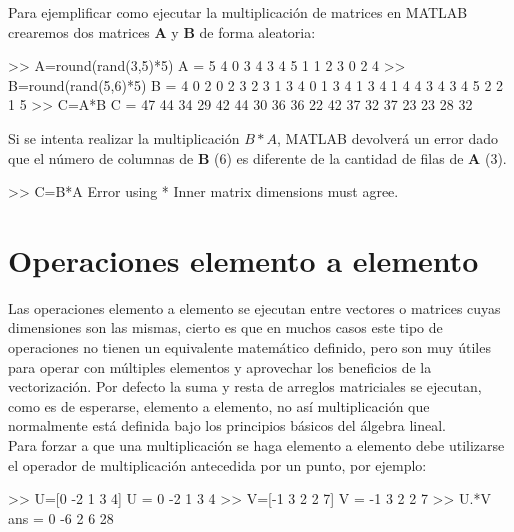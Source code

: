 Para ejemplificar como ejecutar la multiplicación de matrices en MATLAB
crearemos dos matrices \textbf{A} y \textbf{B} de forma aleatoria:

\begin{matlab}
>> A=round(rand(3,5)*5)
A =
     5     4     0     3     4
     3     4     5     1     1
     2     3     0     2     4
>> B=round(rand(5,6)*5)
B =
     4     0     2     0     2     3
     2     3     1     3     4     0
     1     3     4     1     3     4
     1     4     4     3     4     3
     4     5     2     2     1     5
>> C=A*B
C =
    47    44    34    29    42    44
    30    36    36    22    42    37
    32    37    23    23    28    32
\end{matlab}

Si se intenta realizar la multiplicación $B \ast A$, MATLAB devolverá
un error dado que el número de columnas de \textbf{B} (6) es diferente
de la cantidad de filas de \textbf{A} (3).

\begin{matlab}
>> C=B*A
Error using  * 
Inner matrix dimensions must agree. 
\end{matlab}

\section{Operaciones elemento a elemento}\label{operaciones-elemento-a-elemento}

Las operaciones elemento a elemento se ejecutan entre vectores o
matrices cuyas dimensiones son las mismas, cierto es que en muchos casos
este tipo de operaciones no tienen un equivalente matemático definido,
pero son muy útiles para operar con múltiples elementos y aprovechar los
beneficios de la vectorización. Por defecto la suma y resta de arreglos
matriciales se ejecutan, como es de esperarse, elemento a elemento, no
así multiplicación que normalmente está definida bajo los principios
básicos del álgebra lineal.\\

Para forzar a que una multiplicación se haga elemento a elemento debe
utilizarse el operador de multiplicación antecedida por un punto, por
ejemplo:

\begin{matlab}
>> U=[0 -2 1 3 4]
U =
     0    -2     1     3     4
>> V=[-1 3 2 2 7]
V =
    -1     3     2     2     7
>> U.*V
ans =
     0    -6     2     6    28
\end{matlab}

